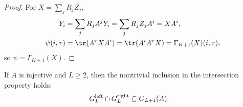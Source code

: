 \begin{proof}
    \leanok
    For $X=\sum_jR_jZ_j$,
    \begin{align}
        Y_i
         & =\sum_jR_jA^jY_i
        =\sum_jR_jZ_jA^i
        =XA^i,
        \notag               \\
        \psi(i,\tau)
         & =\tr(A^\tau XA^i)
        =\tr(A^iA^\tau X)
        =\Gamma_{K+1}(X)(i,\tau),
        \notag
    \end{align}
    so $\psi=\Gamma_{K+1}(X)$.
\end{proof}

\begin{lemma}\label{thm:ground_space_intersection}
    \leanok
    If $A$ is injective and $L \ge 2$, then the nontrivial inclusion in the
    intersection property holds:
    \begin{align}
        G_L^{\mathrm{left}}\cap G_L^{\mathrm{right}}
         & \subseteq G_{L+1}(A).
        \notag
    \end{align}
\end{lemma}

